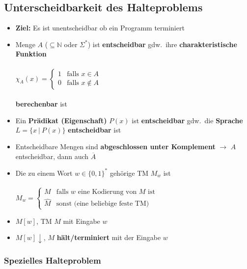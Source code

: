 \documentclass[ieeetran]{article}
\begin{document}
\subsection{Unterscheidbarkeit des Halteproblems} %
\label{sub:unterscheidbarkeit_des_halteproblems}
\begin{itemize}
  \item \textbf{Ziel:} Es ist unentscheidbar ob ein Programm terminiert

  \item Menge $A$ ($\subseteq \mathbb{N}$ oder $\Sigma^*$) ist \textbf{entscheidbar} gdw.\ ihre \textbf{charakteristische Funktion}
\\\\ \begin{math}
		\chi_A(x) = \left\{
			\begin{array}{ll}
				1 & \mbox{falls $x \in A$ }\\
				0 & \mbox{falls $x \not\in A$}
		\end{array}
		\right.
	\end{math}
\\\\\textbf{berechenbar} ist

\item Ein \textbf{Prädikat (Eigenschaft)} $P(x)$ ist \textbf{entscheidbar} gdw.\ die \textbf{Sprache} $L =\{x \ | \ P(x)\}$ \textbf{entscheidbar} ist

\item Entscheidbare Mengen sind \textbf{abgeschlossen unter Komplement} $\rightarrow$ $A$ entscheidbar, dann auch $\overline{A}$

\item Die zu einem Wort $w \in \{0,1\}^*$ gehörige TM $M_w$ ist
\\\\\begin{math}
		M_w =  \left\{
			\begin{array}{ll}
				M & \mbox{falls $w$ eine Kodierung von $M$ ist}\\
				\hat{M} & \mbox{sonst (eine beliebige feste TM)}
		\end{array}
		\right.
	\end{math}
	
\item $M[w]$, TM $M$ mit Eingabe $w$
\item $M[w]\downarrow$, $M$ \textbf{hält/terminiert} mit der Eingabe $w$
\end{itemize}

\subsubsection{Spezielles Halteproblem} %
\label{ssub:spezielles_halteproblem}
\end{document}

